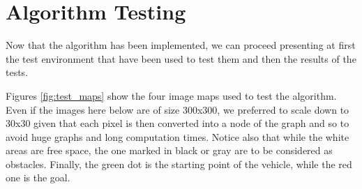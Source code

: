 \section{Algorithm Testing}
\label{sec:algorithm_testing}

Now that the algorithm has been implemented, we can proceed presenting at first the test environment that have been used to test them and then the results of the tests.

Figures \ref{fig:test_maps} show the four image maps used to test the algorithm.
Even if the images here below are of size 300x300, we preferred to scale down to 30x30 given that each pixel is then converted into a node of the graph and so to avoid huge graphs and long computation times.
Notice also that while the white areas are free space, the one marked in black or gray are to be considered as obstacles.
Finally, the green dot is the starting point of the vehicle, while the red one is the goal.

